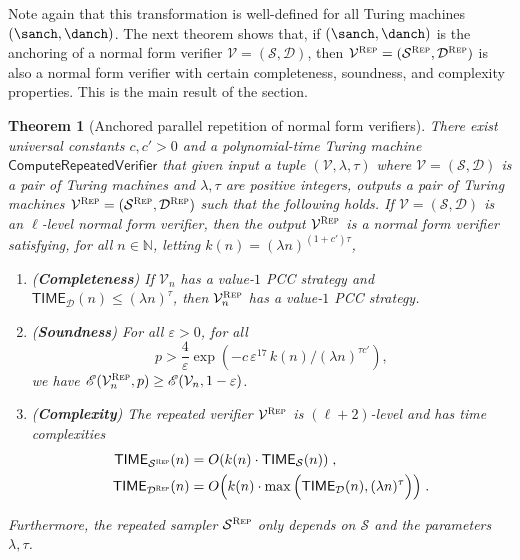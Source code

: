 \documentclass[11pt]{article}
\newtheorem{theorem}{Theorem}[section]
\theoremstyle{definition}
\newcommand{\N}{\ensuremath{\mathbb{N}}}
\newcommand{\eps}{\varepsilon}
\newcommand{\sampler}{\mathcal{S}}
\newcommand{\decider}{\mathcal{D}}
\newcommand{\verifier}{\mathcal{V}}
\newcommand{\gamestyle}[1]{\ensuremath{\textsc{#1}}\xspace}
\newcommand{\Ent}{\mathscr{E}}
\newcommand{\TIME}{\mathsf{TIME}}
\newcommand{\tmstyle}[1]{\ensuremath{\mathsf{#1}}}
\newcommand{\ComputeParrepVerifier}{\tmstyle{ComputeRepeatedVerifier}}
\newcommand{\rep}{\gamestyle{Rep}}
\begin{document}
Note again that this transformation is well-defined for all Turing machines $(\sanch,\danch)$. The next theorem shows that, if $(\sanch,\danch)$ is the anchoring of a normal form verifier $\verifier = (\sampler,\decider)$, then $\verifier^\rep = (\sampler^\rep,\decider^\rep)$ is also a normal form verifier with certain completeness, soundness, and complexity properties. This is the main result of the section.






\begin{theorem}[Anchored parallel repetition of normal form verifiers]
  \label{thm:repetition}
  There exist universal constants $c,c' > 0$ and a polynomial-time Turing machine
  $\ComputeParrepVerifier$ that given input a tuple $(\verifier,\lambda,\tau)$ where $\verifier = (\sampler,\decider)$ is a pair of Turing machines and $\lambda,\tau$ are positive integers, 
  outputs a pair of Turing machines $\verifier^\rep = (\sampler^\rep,
  \decider^\rep)$ 
  such that the following holds.
	If $\verifier = (\sampler,\decider)$ is an $\ell$-level normal form verifier, then the output $\verifier^\rep$ 
	is a normal form verifier satisfying, for all $n \in \N$, letting $k(n) = (\lambda n)^{(1+c')\tau}$, 
\begin{enumerate}
	\item \label{enu:pr-completeness} (\textbf{Completeness}) If $\verifier_n$ has
    a value-$1$ PCC strategy and $\TIME_\decider(n) \leq (\lambda n)^\tau$, then $\verifier^{\rep}_n$ has a value-$1$ PCC
    strategy.

  \item \label{enu:pr-soundness} (\textbf{Soundness}) For all $\eps > 0$, for
    all
    \begin{equation*}
      p > \frac{4}{\eps} \exp \left ( - c \, \eps^{17} \, k(n)/(\lambda n)^{\tau c'} \right), \end{equation*}
	we have $\Ent(\verifier^\rep_n, p) \geq \Ent(\verifier_n, 1 - \eps)$.


  \item \label{enu:pr-complexity} (\textbf{Complexity}) The repeated verifier
    $\verifier^\rep$ is $(\ell+2)$-level and has time complexities
    \begin{align*}
      \TIME_{\sampler^\rep}(n) & = O(k(n) \cdot \TIME_\sampler(n))\;,\\
      \TIME_{\decider^\rep}(n) & = O \Big(k(n) \cdot \max \Big(\TIME_\decider(n) ,  (\lambda n)^\tau \Big) \Big)\;.
    \end{align*}
  \end{enumerate}
  Furthermore, the repeated sampler $\sampler^\rep$ only depends on $\sampler$ and the parameters $\lambda,\tau$.
\end{theorem}
\end{document}
